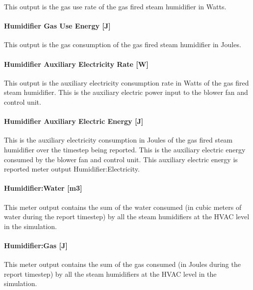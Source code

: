 This output is the gas use rate of the gas fired steam humidifier in Watts.

\paragraph{Humidifier Gas Use Energy {[}J{]}}\label{humidifier-gas-use-energy-j}

This output is the gas consumption of the gas fired steam humidifier in Joules.

\paragraph{Humidifier Auxiliary Electricity Rate {[}W{]}}\label{humidifier-auxiliary-electric-power-w}

This output is the auxiliary electricity consumption rate in Watts of the gas fired steam humidifier. This is the auxiliary electric power input to the blower fan and control unit.

\paragraph{Humidifier Auxiliary Electric Energy {[}J{]}}\label{humidifier-auxiliary-electric-energy-j}

This is the auxiliary electricity consumption in Joules of the gas fired steam humidifier over the timestep being reported. This is the auxiliary electric energy consumed by the blower fan and control unit. This auxiliary electric energy is reported meter output Humidifier:Electricity.

\paragraph{Humidifier:Water {[}m3{]}}\label{humidifierwater-m3-1}

This meter output contains the sum of the water consumed (in cubic meters of water during the report timestep) by all the steam humidifiers at the HVAC level in the simulation.

\paragraph{Humidifier:Gas {[}J{]}}\label{humidifiergas-j}

This meter output contains the sum of the gas consumed (in Joules during the report timestep) by all the steam humidifiers at the HVAC level in the simulation.


